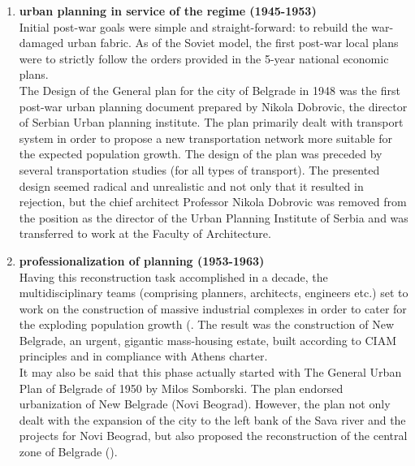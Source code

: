 \documentclass[11pt]{report}
\begin{document}
\begin{enumerate}
\item \textbf{urban planning in service of the regime (1945-1953)}
\\
Initial post-war goals were simple and straight-forward: to rebuild the war-damaged urban fabric. As of the Soviet model, the first post-war local plans were to strictly follow the orders provided in the 5-year national economic plans. 
\\

The Design of the General plan for the city of Belgrade in 1948 was the first post-war urban planning document prepared by Nikola Dobrovic, the director of Serbian Urban planning institute. The plan primarily dealt with transport system in order to propose a new transportation network more suitable for the expected population growth. The design of the plan was preceded by several transportation studies (for all types of transport). The presented design seemed radical and unrealistic and not only that it resulted in rejection, but the chief architect Professor Nikola Dobrovic was removed from the position as the director of the Urban Planning Institute of Serbia and was transferred to work at the Faculty of Architecture.

\item \textbf{professionalization of planning (1953-1963)}
\\
Having this reconstruction task accomplished in a decade, the multidisciplinary teams (comprising planners, architects, engineers etc.) set to work on the construction of massive industrial complexes in order to cater for the exploding population growth (\href{}{\citealt{hirt_belgrade_2009}}. The result was the construction of New Belgrade, an urgent, gigantic mass-housing estate, built according to CIAM principles and in compliance with Athens charter.
\\

It may also be said that this phase actually started with The  General  Urban  Plan  of  Belgrade of 1950 by Milos Somborski.
The plan endorsed urbanization of New Belgrade (Novi Beograd). However, the plan not only dealt with the expansion of the city to the left bank of the Sava river and the projects for Novi Beograd, but also proposed the reconstruction of the central zone of Belgrade (\href{}{\citealt{grozdanic_belgrade_2008}}).


\end{enumerate}
\end{document}
